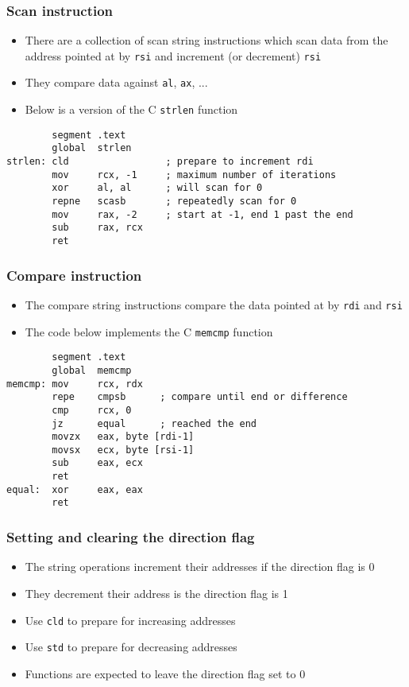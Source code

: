 \documentclass{beamer}
\begin{document}
\begin{frame}[fragile]
    \frametitle{Scan instruction}
    \begin{itemize}
        \item There are a collection of scan string instructions
              which scan data from the address pointed at by {\tt rsi}
              and increment (or decrement) {\tt rsi}
        \item They compare data against {\tt al}, {\tt ax}, ...
        \item Below is a version of the C {\tt strlen} function
    \end{itemize}
\begin{verbatim}
        segment .text
        global  strlen
strlen: cld                 ; prepare to increment rdi
        mov     rcx, -1     ; maximum number of iterations
        xor     al, al      ; will scan for 0
        repne   scasb       ; repeatedly scan for 0
        mov     rax, -2     ; start at -1, end 1 past the end
        sub     rax, rcx   
        ret
\end{verbatim}
\end{frame}


\begin{frame}[fragile]
    \frametitle{Compare instruction}
    \begin{itemize}
        \item The compare string instructions compare the data
              pointed at by {\tt rdi} and {\tt rsi}
        \item The code below implements the C {\tt memcmp} function
    \end{itemize}
\begin{verbatim}
        segment .text
        global  memcmp
memcmp: mov     rcx, rdx
        repe    cmpsb      ; compare until end or difference
        cmp     rcx, 0
        jz      equal      ; reached the end
        movzx   eax, byte [rdi-1]
        movsx   ecx, byte [rsi-1]
        sub     eax, ecx
        ret
equal:  xor     eax, eax
        ret
\end{verbatim}
\end{frame}

\begin{frame}
    \frametitle{Setting and clearing the direction flag}
    \begin{itemize}
        \item The string operations increment their addresses if the
              direction flag is 0
        \item They decrement their address is the direction flag is 1
        \item Use {\tt cld} to prepare for increasing addresses
        \item Use {\tt std} to prepare for decreasing addresses
        \item Functions are expected to leave the direction flag set to 0
    \end{itemize}
\end{frame}
\end{document}
